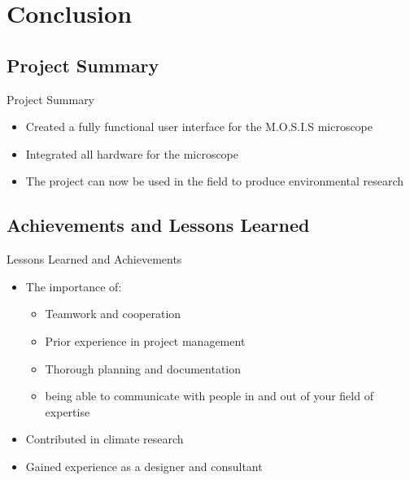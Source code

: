 \documentclass[17pt, aspectratio=169]{beamer}
\begin{document}
\section{Conclusion}
\subsection{Project Summary}
\begin{frame}{Project Summary}
	\begin{itemize}
		\item Created a fully functional user interface for the M.O.S.I.S microscope
		\item Integrated all hardware for the microscope
		\item The project can now be used in the field to produce environmental research
	\end{itemize}
\end{frame}
\subsection{Achievements and Lessons Learned}
\begin{frame}{Lessons Learned and Achievements}
	\begin{itemize}
		\item The importance of:
		      \begin{itemize}
			      \item Teamwork and cooperation
			      \item Prior experience in project management
			      \item Thorough planning and documentation
			      \item being able to communicate with people in and out of your field of expertise
		      \end{itemize}
		\item Contributed in climate research
		\item Gained experience as a designer and consultant
	\end{itemize}
\end{frame}
\end{document}
